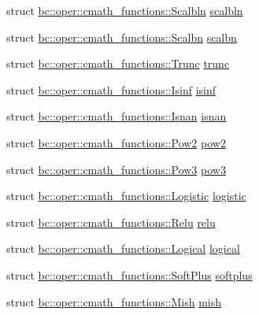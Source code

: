 \begin{DoxyCompactItemize}
struct \hyperlink{structbc_1_1oper_1_1cmath__functions_1_1Scalbln}{bc\+::oper\+::cmath\+\_\+functions\+::\+Scalbln} \hyperlink{namespacebc_1_1oper_1_1cmath__functions_ab0b9b7f20aadbdb8f4be104a4cb160e3}{scalbln}
\item 
struct \hyperlink{structbc_1_1oper_1_1cmath__functions_1_1Scalbn}{bc\+::oper\+::cmath\+\_\+functions\+::\+Scalbn} \hyperlink{namespacebc_1_1oper_1_1cmath__functions_aebd30a0fe772ea9056e3a7b321d8fba3}{scalbn}
\item 
struct \hyperlink{structbc_1_1oper_1_1cmath__functions_1_1Trunc}{bc\+::oper\+::cmath\+\_\+functions\+::\+Trunc} \hyperlink{namespacebc_1_1oper_1_1cmath__functions_a61a28e08817a53671110eabf4d8e15fe}{trunc}
\item 
struct \hyperlink{structbc_1_1oper_1_1cmath__functions_1_1Isinf}{bc\+::oper\+::cmath\+\_\+functions\+::\+Isinf} \hyperlink{namespacebc_1_1oper_1_1cmath__functions_aeda712b826512845a8273fe5ede96c9f}{isinf}
\item 
struct \hyperlink{structbc_1_1oper_1_1cmath__functions_1_1Isnan}{bc\+::oper\+::cmath\+\_\+functions\+::\+Isnan} \hyperlink{namespacebc_1_1oper_1_1cmath__functions_ab6e9b2070f6a77dff6a465ece81aa56c}{isnan}
\item 
struct \hyperlink{structbc_1_1oper_1_1cmath__functions_1_1Pow2}{bc\+::oper\+::cmath\+\_\+functions\+::\+Pow2} \hyperlink{namespacebc_1_1oper_1_1cmath__functions_a89f45093b7ad33d76972df63245ffd16}{pow2}
\item 
struct \hyperlink{structbc_1_1oper_1_1cmath__functions_1_1Pow3}{bc\+::oper\+::cmath\+\_\+functions\+::\+Pow3} \hyperlink{namespacebc_1_1oper_1_1cmath__functions_abc4de77ba4a39d19f9b0b12d5366d660}{pow3}
\item 
struct \hyperlink{structbc_1_1oper_1_1cmath__functions_1_1Logistic}{bc\+::oper\+::cmath\+\_\+functions\+::\+Logistic} \hyperlink{namespacebc_1_1oper_1_1cmath__functions_a63ed459515a3be468d8dedaa652b67d0}{logistic}
\item 
struct \hyperlink{structbc_1_1oper_1_1cmath__functions_1_1Relu}{bc\+::oper\+::cmath\+\_\+functions\+::\+Relu} \hyperlink{namespacebc_1_1oper_1_1cmath__functions_a9032a721c0561615376aca1e89251c2a}{relu}
\item 
struct \hyperlink{structbc_1_1oper_1_1cmath__functions_1_1Logical}{bc\+::oper\+::cmath\+\_\+functions\+::\+Logical} \hyperlink{namespacebc_1_1oper_1_1cmath__functions_ad51a568d60c84fadfb78cea598abc537}{logical}
\item 
struct \hyperlink{structbc_1_1oper_1_1cmath__functions_1_1SoftPlus}{bc\+::oper\+::cmath\+\_\+functions\+::\+Soft\+Plus} \hyperlink{namespacebc_1_1oper_1_1cmath__functions_a47ed73f57df7e47d19f5ea67a5f6cd37}{softplus}
\item 
struct \hyperlink{structbc_1_1oper_1_1cmath__functions_1_1Mish}{bc\+::oper\+::cmath\+\_\+functions\+::\+Mish} \hyperlink{namespacebc_1_1oper_1_1cmath__functions_a02c2fece5de769cc83e216e21288196b}{mish}
\end{DoxyCompactItemize}


